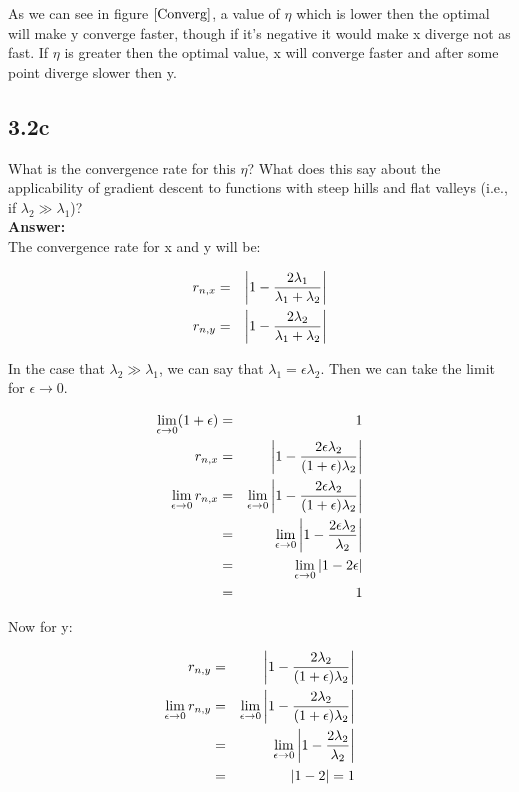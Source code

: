 \documentclass[a4paper]{article}
\begin{document}
As we can see in figure $\ref{Converg}$, a value of $\eta$ which is lower then the optimal will make y converge faster, though if it's negative it would make x diverge not as fast. If $\eta$ is greater then the optimal value, x will converge faster and after some point diverge slower then y.

\newpage
\subsection*{3.2c}

What is the convergence rate for this $\eta$? What does this say about the applicability of
gradient descent to functions with steep hills and flat valleys (i.e., if $\lambda_2 \gg \lambda_1$)?\\

\textbf{Answer:}\\

The convergence rate for x and y  will be:

\begin{eqnarray}
r_{n,x} &=& \abs{1 - \frac{2\lambda_1}{\lambda_1 + \lambda_2}}\\
r_{n,y} &=& \abs{1 - \frac{2\lambda_2}{\lambda_1 + \lambda_2}}
\end{eqnarray}

In the case that $\lambda_2 \gg \lambda_1$, we can say that $\lambda_1 = \epsilon \lambda_2$. Then we can take the limit for $\epsilon \rightarrow 0$.

\begin{eqnarray}
\lim_{\epsilon \rightarrow 0} (1+\epsilon) &=& 1\\
r_{n,x} &=& \abs{1 - \frac{2\epsilon \lambda_2}{(1 + \epsilon) \lambda_2}}\\
\lim_{ \epsilon\rightarrow 0} r_{n,x} &=& \lim_{ \epsilon\rightarrow 0} \abs{1 - \frac{2\epsilon \lambda_2}{(1 + \epsilon) \lambda_2}}\\
&=& \lim_{ \epsilon\rightarrow 0} \abs{1 - \frac{2 \epsilon\lambda_2}{\lambda_2}}\\
&=& \lim_{ \epsilon\rightarrow 0} \abs{1 - 2\epsilon}\\
&=& 1
\end{eqnarray}

Now for y:

\begin{eqnarray}
r_{n,y} &=& \abs{ 1- \frac{2\lambda_2}{(1+\epsilon) \lambda_2}}\\
\lim_{ \epsilon\rightarrow 0} r_{n,y} &=& \lim_{ \epsilon\rightarrow 0} \abs{ 1- \frac{2\lambda_2}{(1+\epsilon) \lambda_2}}\\
&=& \lim_{ \epsilon\rightarrow 0} \abs{ 1- \frac{2\lambda_2}{ \lambda_2}}\\
&=& \abs{1 - 2} = 1
\end{eqnarray}
\end{document}
